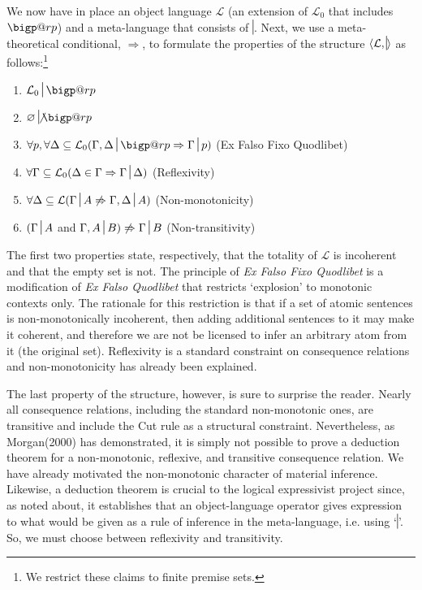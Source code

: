 \documentclass{article}
\makeatletter
\newcommand{\nc}{\turnstile{s}{w}{}{}{n}}
\newcommand{\bigperp}{%
  \mathop{\mathpalette\bigp@rp\relax}%
  \displaylimits
}
\newcommand{\bigp@rp}[2]{%
  \vcenter{
    \m@th\hbox{\scalebox{\ifx#1\displaystyle2.1\else1.5\fi}{$#1\perp$}}
  }%
}
\makeatother
\begin{document}
We now have in place an object language $ \mathcal{L} $ (an extension of  $ \mathcal{L}_0 $ that includes $ \bigperp $) and a meta-language that consists of $ \nc $. Next, we use a meta-theoretical conditional, $ \Rightarrow $, to formulate the properties of the structure $ \langle \mathcal{L}, \nc \rangle  $ as follows:\footnote{We restrict these claims to finite premise sets.}

\begin{enumerate}
	\item $  \mathcal{L}_0\nc\bigperp$
	\item $ \varnothing\not\nc\bigperp $
	\item  $ \forall p, \forall\Delta\subseteq\mathcal{L}_0(\Gamma, \Delta \nc\bigperp \Rightarrow \Gamma\nc p) $ (Ex Falso Fixo Quodlibet)
	\item $\forall \Gamma\subseteq\mathcal{L}_0 (\Delta \in \Gamma \Rightarrow \Gamma\nc \Delta)$ (Reflexivity)
	\item $\forall\Delta\subseteq\mathcal{L}(\Gamma\nc A \not\Rightarrow \Gamma, \Delta \nc A)$ (Non-monotonicity)
	\item $(\Gamma\nc A $ and $ \Gamma, A \nc B ) \not\Rightarrow \Gamma \nc B$ (Non-transitivity)
\end{enumerate}

The first two properties state, respectively, that the totality of $ \mathcal{L} $ is incoherent and that the empty set is not. The principle of \textit{Ex Falso Fixo Quodlibet} is a modification of \textit{Ex Falso Quodlibet} that restricts `explosion' to monotonic contexts only. The rationale for this restriction is that if a set of atomic sentences is non-monotonically incoherent, then adding additional sentences to it may make it coherent, and therefore we are not be licensed to infer an arbitrary atom from it (the original set). Reflexivity is a standard constraint on consequence relations and non-monotonicity has already been explained. 

The last property of the structure, however, is sure to surprise the reader. Nearly all consequence relations, including the standard non-monotonic ones, are transitive and include the Cut rule as a structural constraint. Nevertheless, as Morgan(2000) has demonstrated, it is simply not possible to prove a deduction theorem for a non-monotonic, reflexive, and transitive consequence relation. We have already motivated the non-monotonic character of material inference. Likewise, a deduction theorem is crucial to the logical expressivist project since, as noted about, it establishes that an object-language operator gives expression to what would be given as a rule of inference in the meta-language, i.e. using `$ \nc $'. So, we must choose between  reflexivity and transitivity. 
\end{document}
